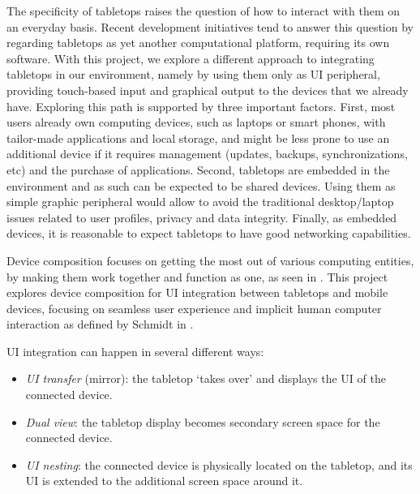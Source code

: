 The specificity of tabletops raises the question of how to interact with them on an everyday basis.
Recent development initiatives tend to answer this question by regarding tabletops as yet another computational platform, requiring its own software.
With this project, we explore a different approach to integrating tabletops in our environment, namely by using them only as UI peripheral, providing touch-based input and graphical output to the devices that we already have.
Exploring this path is supported by three important factors.
First, most users already own computing devices, such as laptops or smart phones, with tailor-made applications and local storage, and might be less prone to use an additional device if it requires management (updates, backups, synchronizations, etc) and the purchase of applications.
Second, tabletops are embedded in the environment and as such can be expected to be shared devices.
Using them as simple graphic peripheral would allow to avoid the traditional desktop/laptop issues related to user profiles, privacy and data integrity.
Finally, as embedded devices, it is reasonable to expect tabletops to have good networking capabilities.

Device composition focuses on getting the most out of various computing entities, by making them work together and function as one, as seen in \cite{Bardram:2010:compute}.
This project explores device composition for UI integration between tabletops and mobile devices, focusing on seamless user experience and implicit human computer interaction as defined by Schmidt in \cite{Schmidt:2000:implicit}.

UI integration can happen in several different ways:
\begin{itemize}
\item{\emph{UI transfer} (mirror): the tabletop `takes over' and displays the UI of the connected device.}
\item{\emph{Dual view}: the tabletop display becomes secondary screen space for the connected device.}
\item{\emph{UI nesting}: the connected device is physically located on the tabletop, and its UI is extended to the additional screen space around it.}
\end{itemize}

